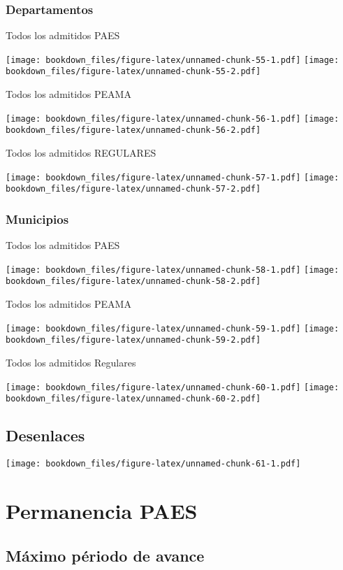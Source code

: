 \documentclass[]{article}
\theoremstyle{definition}
\theoremstyle{definition}
\theoremstyle{definition}
\theoremstyle{remark}
\begin{document}
\subsubsection{Departamentos}\label{departamentos}

Todos los admitidos PAES

\texttt{[image: bookdown\_files/figure-latex/unnamed-chunk-55-1.pdf]}
\texttt{[image: bookdown\_files/figure-latex/unnamed-chunk-55-2.pdf]}

Todos los admitidos PEAMA

\texttt{[image: bookdown\_files/figure-latex/unnamed-chunk-56-1.pdf]}
\texttt{[image: bookdown\_files/figure-latex/unnamed-chunk-56-2.pdf]}

Todos los admitidos REGULARES

\texttt{[image: bookdown\_files/figure-latex/unnamed-chunk-57-1.pdf]}
\texttt{[image: bookdown\_files/figure-latex/unnamed-chunk-57-2.pdf]}

\subsubsection{Municipios}\label{municipios}

Todos los admitidos PAES

\texttt{[image: bookdown\_files/figure-latex/unnamed-chunk-58-1.pdf]}
\texttt{[image: bookdown\_files/figure-latex/unnamed-chunk-58-2.pdf]}

Todos los admitidos PEAMA

\texttt{[image: bookdown\_files/figure-latex/unnamed-chunk-59-1.pdf]}
\texttt{[image: bookdown\_files/figure-latex/unnamed-chunk-59-2.pdf]}

Todos los admitidos Regulares

\texttt{[image: bookdown\_files/figure-latex/unnamed-chunk-60-1.pdf]}
\texttt{[image: bookdown\_files/figure-latex/unnamed-chunk-60-2.pdf]}

\subsection{Desenlaces}\label{desenlaces}

\texttt{[image: bookdown\_files/figure-latex/unnamed-chunk-61-1.pdf]}

\section{Permanencia PAES}\label{permanencia-paes}

\subsection{Máximo périodo de avance}\label{maximo-periodo-de-avance}
\end{document}
